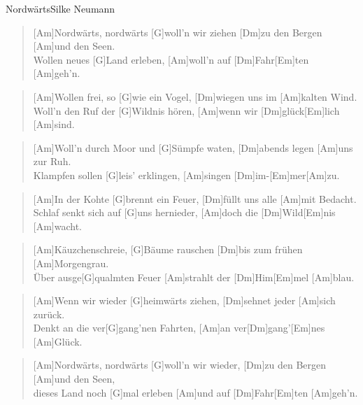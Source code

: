 \begin{song}{Nordwärts}{Silke Neumann}

    \begin{verse}  
        [Am]Nordwärts, nordwärts [G]woll'n wir ziehen [Dm]zu den Bergen [Am]und den Seen. \\
        [C]Wollen neues [G]Land erleben, [Am]woll'n auf [Dm]Fahr[Em]ten [Am]geh'n.
    \end{verse}  

    \begin{verse}  
        [Am]Wollen frei, so [G]wie ein Vogel, [Dm]wiegen uns im [Am]kalten Wind. \\
        [C]Woll'n den Ruf der [G]Wildnis hören, [Am]wenn wir [Dm]glück[Em]lich [Am]sind. 
    \end{verse}  

    \begin{verse}  
        [Am]Woll'n durch Moor und [G]Sümpfe waten, [Dm]abends legen [Am]uns zur Ruh. \\
        [C]Klampfen sollen [G]leis' erklingen, [Am]singen [Dm]im-[Em]mer[Am]zu. 
    \end{verse}  

    \begin{verse}  
        [Am]In der Kohte [G]brennt ein Feuer, [Dm]füllt uns alle [Am]mit Bedacht. \\
        [C]Schlaf senkt sich auf [G]uns hernieder, [Am]doch die [Dm]Wild[Em]nis [Am]wacht. 
    \end{verse}  

    \begin{verse}  
        [Am]Käuzchenschreie, [G]Bäume rauschen [Dm]bis zum frühen [Am]Morgengrau. \\
        [C]{}Über ausge[G]qualmten Feuer [Am]strahlt der [Dm]Him[Em]mel [Am]blau.
    \end{verse}  

    \begin{verse}  
        [Am]Wenn wir wieder [G]heimwärts ziehen, [Dm]sehnet jeder [Am]sich zurück. \\
        [C]Denkt an die ver[G]gang'nen Fahrten, [Am]an ver[Dm]gang'[Em]nes [Am]Glück. 
    \end{verse}  

    \begin{verse}  
        [Am]Nordwärts, nordwärts [G]woll'n wir wieder, [Dm]zu den Bergen [Am]und den Seen, \\
        [C]dieses Land noch [G]mal erleben [Am]und auf [Dm]Fahr[Em]ten [Am]geh'n.
    \end{verse}  

\end{song}
